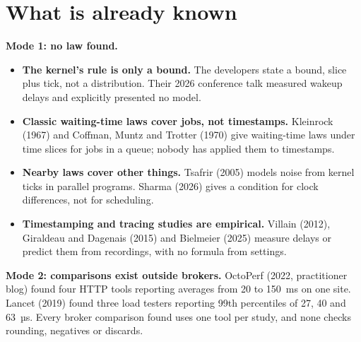 \documentclass[11pt]{article}
\begin{document}
\section{What is already known}
\textbf{Mode 1: no law found.}
\begin{itemize}
  \item \textbf{The kernel's rule is only a bound.} The developers state a bound, slice plus tick, not a distribution. Their 2026 conference talk measured wakeup delays and explicitly presented no model.
  \item \textbf{Classic waiting-time laws cover jobs, not timestamps.} Kleinrock (1967) and Coffman, Muntz and Trotter (1970) give waiting-time laws under time slices for jobs in a queue; nobody has applied them to timestamps.
  \item \textbf{Nearby laws cover other things.} Tsafrir (2005) models noise from kernel ticks in parallel programs. Sharma (2026) gives a condition for clock differences, not for scheduling.
  \item \textbf{Timestamping and tracing studies are empirical.} Villain (2012), Giraldeau and Dagenais (2015) and Bielmeier (2025) measure delays or predict them from recordings, with no formula from settings.
\end{itemize}

\textbf{Mode 2: comparisons exist outside brokers.} OctoPerf (2022, practitioner blog) found four HTTP tools reporting averages from 20 to 150~ms on one site. Lancet (2019) found three load testers reporting 99th percentiles of 27, 40 and 63~µs. Every broker comparison found uses one tool per study, and none checks rounding, negatives or discards.
\end{document}
